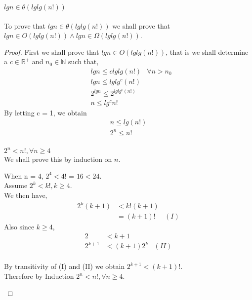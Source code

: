 \documentclass[12pt]{article}
\newcommand{\N}{\mathbb{N}}
\newcommand{\R}{\mathbb{R}}
\newenvironment{lemma}[2][Lemma]{\begin{trivlist}
\item[\hskip \labelsep {\bfseries #1}\hskip \labelsep {\bfseries #2.}]}{\end{trivlist}}
\newenvironment{question}[2][Question]{\begin{trivlist}
\item[\hskip \labelsep {\bfseries #1}\hskip \labelsep {\bfseries #2.}]}{\end{trivlist}}
\begin{document}
\begin{question}{2} $lgn \in \theta(lglg(n!))$
  \leavevmode \\ \\
  To prove that $lgn \in \theta(lglg(n!))$ we shall prove that
  $lgn \in O(lglg(n!)) \land lgn \in \Omega(lglg(n!))$.

  \begin{proof}
    First we shall prove that $lgn \in O(lglg(n!))$, that is we shall determine
    a $c \in \R^{+}$ and $n_{0} \in \N$ such that,
    \begin{align*}
      & lgn \leq clglg(n!)    & \forall n > n_{0} \\
      & lgn \leq lglg^{c}(n!) & \\
      & 2^{lgn} \leq 2^{lglg^{c}(n!)} &\\
      & n \leq lg^{c}n! &
    \end{align*}
    By letting c = 1, we obtain
    \begin{align*}
      & n \leq lg(n!) &\\
      & 2^{n} \leq n! &\\
    \end{align*}

    \begin{lemma}{1} $2^{n} < n!, \forall n \geq 4$
      \leavevmode \\
      We shall prove this by induction on $n$.

       When n = 4, $2^{4} < 4!$ = $16 < 24$. \\
       Assume $2^{k} < k!, k \geq 4$. \\
       We then have,
      \begin{align*}
        2^{k}(k + 1) & < k!(k + 1) &\\
                     & = (k + 1)! & (I)
      \end{align*}
      Also since $k \geq 4$,
      \begin{align*}
        2       & < k + 1        &\\
        2^{k+1} & < (k + 1)2^{k} & (II)\\
      \end{align*}

      By transitivity of (I) and (II) we obtain $2^{k+1} < (k+1)!$.\\
      Therefore by Induction $2^{n} < n!, \forall n \geq 4$.
    \end{lemma}


\end{proof}
\end{question}
\end{document}
